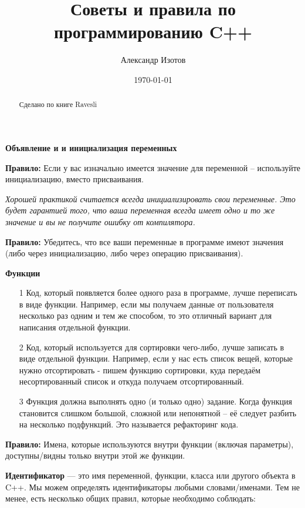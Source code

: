 \documentclass[a4paper,16pt]{report} %
\title{Советы и правила по программированию C++}
\date{\today} %
\author{Александр Изотов}
\begin{document}
	\maketitle %

\begin{abstract} %
Сделано по книге Ravesli
\end{abstract}
\begin{center} %
	\large\textbf{Объявление и и инициализация переменных}
\end{center}

\textbf{Правило:} Если у вас изначально имеется значение для переменной – используйте инициализацию, вместо присваивания.

\textit{Хорошей практикой считается всегда инициализировать свои переменные. Это будет гарантией того, что ваша переменная всегда имеет одно и то же значение и вы не получите ошибку от компилятора.}

\textbf{Правило:} Убедитесь, что все ваши переменные в программе имеют значения (либо через инициализацию, либо через операцию присваивания).
\\
\begin{center} 
	\large\textbf{Функции}
\end{center}

\begin{itemize} %
	\item[1] Код, который появляется более одного раза в программе, лучше переписать в виде функции. Например, если мы получаем данные от пользователя несколько раз одним и тем же способом, то это отличный вариант для написания отдельной функции.
	\item[2] Код, который используется для сортировки чего-либо, лучше записать в виде отдельной функции. Например, если у нас есть список вещей, которые нужно отсортировать - пишем функцию сортировки, куда передаём несортированный список и откуда получаем отсортированный.
	\item[3] Функция должна выполнять одно (и только одно) задание.
	Когда функция становится слишком большой, сложной или непонятной – её следует разбить на несколько подфункций. Это называется рефакторинг кода.
\end{itemize}


\textbf{Правило:} Имена, которые используются внутри функции (включая
параметры), доступны/видны только внутри этой же функции.

\textbf{Идентификатор} — это имя переменной, функции, класса или другого объекта в C++. Мы можем определять идентификаторы любыми словами/именами. Тем не менее, есть несколько общих правил, которые необходимо соблюдать:
\end{document}
